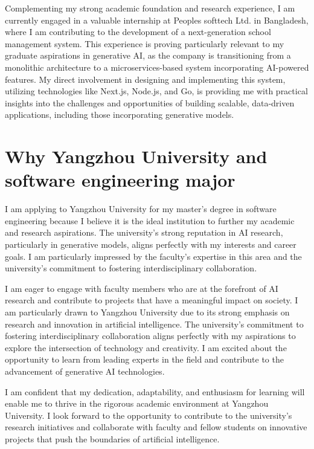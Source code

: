 \documentclass[12pt,a4paper]{article}
\begin{document}
\begin{CJK*}{UTF8}{gbsn}
Complementing my strong academic foundation and research experience, I am currently engaged in a valuable internship at Peoples softtech Ltd. in Bangladesh, where I am contributing to the development of a next-generation school management system. This experience is proving particularly relevant to my graduate aspirations in generative AI, as the company is transitioning from a monolithic architecture to a microservices-based system incorporating AI-powered features. My direct involvement in designing and implementing this system, utilizing technologies like Next.js, Node.js, and Go, is providing me with practical insights into the challenges and opportunities of building scalable, data-driven applications, including those incorporating generative models. 

\section*{Why Yangzhou University and software engineering major}
I am applying to Yangzhou University for my master's degree in software engineering  because I believe it is the ideal institution to further my academic and research aspirations. The university's strong reputation in AI research, particularly in generative models, aligns perfectly with my interests and career goals. I am particularly impressed by the faculty's expertise in this area and the university's commitment to fostering interdisciplinary collaboration.\newline

I am eager to engage with faculty members who are at the forefront of AI research and contribute to projects that have a meaningful impact on society. I am particularly drawn to Yangzhou University due to its strong emphasis on research and innovation in artificial intelligence. The university's commitment to fostering interdisciplinary collaboration aligns perfectly with my aspirations to explore the intersection of technology and creativity. I am excited about the opportunity to learn from leading experts in the field and contribute to the advancement of generative AI technologies.\newline

I am confident that my dedication, adaptability, and enthusiasm for learning will enable me to thrive in the rigorous academic environment at Yangzhou University. I look forward to the opportunity to contribute to the university's research initiatives and collaborate with faculty and fellow students on innovative projects that push the boundaries of artificial intelligence.\newline


\end{CJK*}
\end{document}
